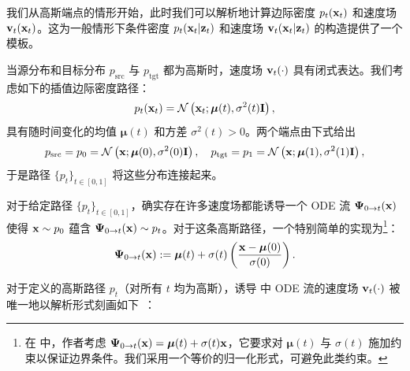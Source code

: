 我们从高斯端点的情形开始，此时我们可以解析地计算边际密度 $p_t({\mathbf{x}}_t)$ 和速度场 ${\mathbf{v}}_t({\mathbf{x}}_t)$。这为一般情形下条件密度 $p_t({\mathbf{x}}_t |{\mathbf{z}}_t)$ 和速度场 ${\mathbf{v}}_t({\mathbf{x}}_t |{\mathbf{z}}_t)$ 的构造提供了一个模板。



当源分布和目标分布 $p_{\text{src}}$ 与 $p_{\text{tgt}}$ 都为高斯时，速度场 ${\mathbf{v}}_t(\cdot)$ 具有闭式表达。我们考虑如下的插值边际密度路径：
\begin{align}\label{eq:gaussian-density-path}
    p_t({\mathbf{x}}_t) = \mathcal{N}\left({\mathbf{x}}_t; \bm{\mu}(t), \sigma^2(t) {\mathbf{I}}\right),
\end{align}
具有随时间变化的均值 $\bm{\mu}(t)$ 和方差 $\sigma^2(t)>0$。两个端点由下式给出
\[
p_{\text{src}} = p_0 =  \mathcal{N}\left({\mathbf{x}}; \bm{\mu}(0), \sigma^2(0) {\mathbf{I}}\right), \quad
p_{\text{tgt}} = p_1 =  \mathcal{N}\left({\mathbf{x}}; \bm{\mu}(1), \sigma^2(1) {\mathbf{I}}\right),
\]
于是路径 $\{p_t\}_{t \in [0,1]}$ 将这些分布连接起来。

对于给定路径 $\{p_t\}_{t \in [0,1]}$，确实存在许多速度场都能诱导一个 ODE 流 $\bm{\Psi}_{0\to t}({\mathbf{x}})$ 使得 ${\mathbf{x}} \sim p_0$ 蕴含 $\bm{\Psi}_{0\to t}({\mathbf{x}}) \sim p_t$。对于这条高斯路径，一个特别简单的实现为\footnote{在 \citep{lipman2022flow} 中，作者考虑 $\bm{\Psi}_{0\to t}({\mathbf{x}}) = \bm{\mu}(t) + \sigma(t){\mathbf{x}}$，它要求对 $\bm{\mu}(t)$ 与 $\sigma(t)$ 施加约束以保证边界条件。我们采用一个等价的归一化形式，可避免此类约束。}：
\begin{align}\label{eq:gaussian-sol-map}
    \bm{\Psi}_{0\to t}({\mathbf{x}}) := \bm{\mu}(t) + \sigma(t) \left( \frac{{\mathbf{x}} - \bm{\mu}(0)}{\sigma(0)} \right).
\end{align}

对于定义的高斯路径 $p_t$（对所有 $t$ 均为高斯），诱导  中 ODE 流的速度场 ${\mathbf{v}}_t(\cdot)$ 被唯一地以解析形式刻画如下~\citep{lipman2022flow}：

